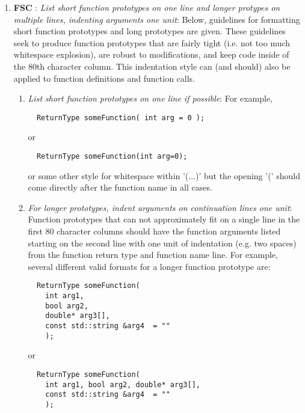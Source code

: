 \begin{enumerate}
{}\item{}\textbf{FSC }:
{}\textit{List short function prototypes on one line and longer protypes
on multiple lines, indenting arguments one unit}: Below, guidelines for
formatting short function prototypes and long prototypes are given.  These
guidelines seek to produce function prototypes that are fairly tight (i.e. not
too much whitespace explosion), are robust to modifications, and keep code
inside of the 80th character column.  This indentation style can (and should)
also be applied to function definitions and function calls.

  \begin{enumerate}

  {}\item\textit{List short function prototypes on one line if possible}: For
  example,

  {\small\begin{verbatim}
  ReturnType someFunction( int arg = 0 );
  \end{verbatim}}

  or 

  {\small\begin{verbatim}
  ReturnType someFunction(int arg=0);
  \end{verbatim}}

  or some other style for whitespace within '(...)' but the opening '(' should
  come directly after the function name in all cases.

  {}\item\textit{For longer prototypes, indent arguments on continuation lines
  one unit}: Function prototypes that can not approximately fit on a single
  line in the first 80 character columns should have the function arguments
  listed starting on the second line with one unit of indentation (e.g. two
  spaces) from the function return type and function name line.  For example,
  several different valid formats for a longer function prototype are:

  {\small\begin{verbatim}
  ReturnType someFunction(
    int arg1,
    bool arg2,
    double* arg3[],
    const std::string &arg4  = ""
    );
  \end{verbatim}}
  
  or
  
  {\small\begin{verbatim}
  ReturnType someFunction(
    int arg1, bool arg2, double* arg3[],
    const std::string &arg4  = ""
    );
  \end{verbatim}}
  

\end{enumerate}
\end{enumerate}
